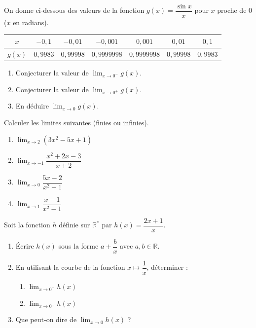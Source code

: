 \documentclass[11pt]{article}
\begin{document}
\begin{exercice}
On donne ci-dessous des valeurs de la fonction $g(x) = \dfrac{\sin x}{x}$ pour $x$ proche de $0$ ($x$ en radians).

\begin{center}
\begin{tabular}{|c|c|c|c|c|c|c|}
\hline
$x$ & $-0,1$ & $-0,01$ & $-0,001$ & $0,001$ & $0,01$ & $0,1$ \\
\hline
$g(x)$ & $0,9983$ & $0,99998$ & $0,9999998$ & $0,9999998$ & $0,99998$ & $0,9983$ \\
\hline
\end{tabular}
\end{center}
\begin{enumerate}
    \item Conjecturer la valeur de $\lim_{x \to 0^-} g(x)$.
    \item Conjecturer la valeur de $\lim_{x \to 0^+} g(x)$.
    \item En déduire $\lim_{x \to 0} g(x)$.
\end{enumerate}
\end{exercice}

\begin{exercice}
Calculer les limites suivantes (finies ou infinies).
\begin{enumerate}
    \item $\lim_{x \to 2} (3x^2 - 5x + 1)$
    \item $\lim_{x \to -1} \dfrac{x^2 + 2x - 3}{x + 2}$
    \item $\lim_{x \to 0} \dfrac{5x - 2}{x^2 + 1}$
    \item $\lim_{x \to 1} \dfrac{x - 1}{x^2 - 1}$
\end{enumerate}
\end{exercice}

\begin{exercice}
Soit la fonction $h$ définie sur $\mathbb{R}^*$ par $h(x) = \dfrac{2x+1}{x}$.
\begin{enumerate}
    \item Écrire $h(x)$ sous la forme $a + \dfrac{b}{x}$ avec $a,b \in \mathbb{R}$.
    \item En utilisant la courbe de la fonction $x \mapsto \dfrac{1}{x}$, déterminer :
    \begin{enumerate}
        \item $\lim_{x \to 0^-} h(x)$
        \item $\lim_{x \to 0^+} h(x)$
    \end{enumerate}
    \item Que peut-on dire de $\lim_{x \to 0} h(x)$ ?
\end{enumerate}
\end{exercice}
\end{document}
